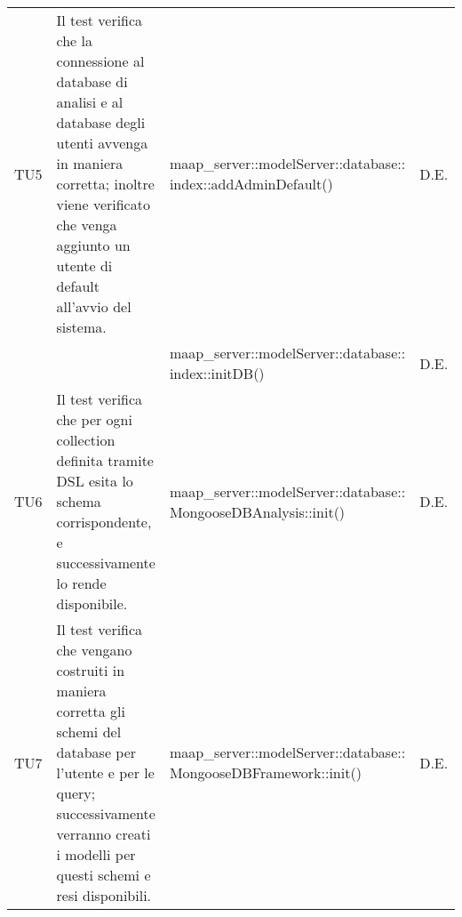 \begin{center}
\begin{longtable}{|p{1cm}|p{5cm}|p{6cm}|p{1cm}|}
\midrule
TU5
& Il test verifica che la connessione al database di analisi e al database degli utenti avvenga in maniera corretta; inoltre viene verificato che venga aggiunto un utente di default all'avvio del sistema.
& maap\_server::modelServer::database:: index::addAdminDefault()
& D.E.\\
& & maap\_server::modelServer::database:: index::initDB()
& D.E.\\

\midrule
TU6
& Il test verifica che per ogni collection definita tramite DSL esita lo schema corrispondente, e successivamente lo rende disponibile.
& maap\_server::modelServer::database:: MongooseDBAnalysis::init()
& D.E.\\

\midrule
TU7
& Il test verifica che vengano costruiti in maniera corretta gli schemi del database per l'utente e per le query; successivamente verranno creati i modelli per questi schemi e resi disponibili.
& maap\_server::modelServer::database:: MongooseDBFramework::init()
& D.E.\\


\end{longtable}
\end{center}
